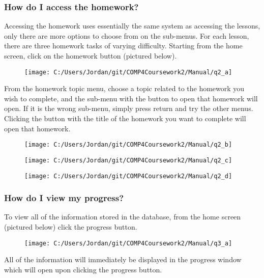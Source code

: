 \subsubsection{How do I access the homework?}

Accessing the homework uses essentially the same system as accessing the lessons, only there are more options to choose from on the sub-menus. For each lesson, there are three homework tasks of varying difficulty. Starting from the home screen, click on the homework button (pictured below).

\begin{figure}[H]
    \texttt{[image: C:/Users/Jordan/git/COMP4Coursework2/Manual/q2\_a]}
\end{figure}

From the homework topic menu, choose a topic related to the homework you wish to complete, and the sub-menu with the button to open that homework will open. If it is the wrong sub-menu, simply press return and try the other menus. Clicking the button with the title of the homework you want to complete will open that homework.

\begin{figure}[H]
    \texttt{[image: C:/Users/Jordan/git/COMP4Coursework2/Manual/q2\_b]}
\end{figure}

\begin{figure}[H]
    \texttt{[image: C:/Users/Jordan/git/COMP4Coursework2/Manual/q2\_c]}
\end{figure}

\begin{figure}[H]
    \texttt{[image: C:/Users/Jordan/git/COMP4Coursework2/Manual/q2\_d]}
\end{figure}

\subsubsection{How do I view my progress?}

To view all of the information stored in the database, from the home screen (pictured below) click the progress button.

\begin{figure}[H]
    \texttt{[image: C:/Users/Jordan/git/COMP4Coursework2/Manual/q3\_a]}
\end{figure}

All of the information will immediately be displayed in the progress window which will open upon clicking the progress button.

